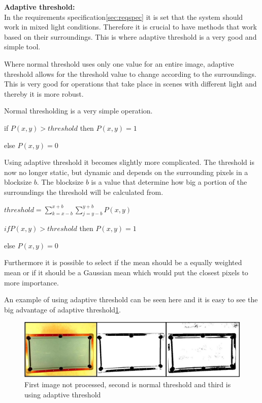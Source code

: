 \textbf{Adaptive threshold:}\\
In the requirements specification\ref{sec:reqspec} it is set that the system should work in mixed light conditions. Therefore it is crucial to have methods that work based on their surroundings. This is where adaptive threshold is a very good and simple tool.

Where normal threshold uses only one value for an entire image, adaptive threshold allows for the threshold value to change according to the surroundings. This is very good for operations that take place in scenes with different light and thereby it is more robust.

Normal thresholding is a very simple operation.\\

\begin{center}
	if $P(x,y) > threshold$ then $P(x,y) = 1$

	else $P(x,y) = 0$\\
\end{center}

Using adaptive threshold it becomes slightly more complicated. The threshold is now no longer static, but dynamic and depends on the surrounding pixels in a blocksize $b$. The blocksize $b$ is a value that determine how big a portion of the surroundings the threshold will be calculated from.\\

\begin{center}
	$threshold = \sum_{k=x-b}^{x+b} \sum_{j=y-b}^{y+b} P(x,y)$

	$if  P(x,y) > threshold$ then $P(x,y) = 1$

	else $P(x,y) = 0$
\end{center}

Furthermore it is possible to select if the mean should be a equally weighted mean or if it should be a Gaussian mean which would put the closest pixels to more importance.

An example of using adaptive threshold can be seen here and it is easy to see the big advantage of adaptive threshold\ref{fig:adaptivethreshold}. 

\begin{figure}[H]
\begin{center}
\leavevmode
\includegraphics[width=1\textwidth]{images/adaptive_threshold.JPG}
\end{center}
\caption{First image not processed, second is normal threshold and third is using adaptive threshold}
\label{fig:adaptivethreshold}
\end{figure}

